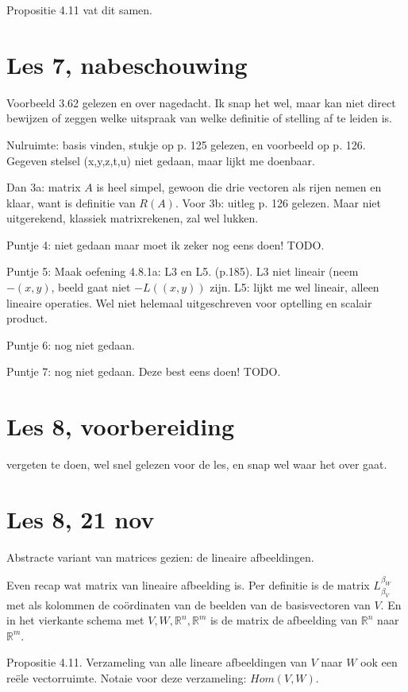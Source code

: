 \documentclass{article}
\begin{document}
Propositie 4.11 vat dit samen. 

\section*{Les 7, nabeschouwing}

Voorbeeld 3.62 gelezen en over nagedacht. Ik snap het wel, maar kan niet direct bewijzen of zeggen welke uitspraak van welke definitie of stelling af te leiden is. 

Nulruimte: basis vinden, stukje op p. 125 gelezen, en voorbeeld op p. 126. Gegeven stelsel (x,y,z,t,u) niet gedaan, maar lijkt me doenbaar. 

Dan 3a: matrix $A$ is heel simpel, gewoon die drie vectoren als rijen nemen en klaar, want is definitie van $R(A)$. Voor 3b: uitleg p. 126 gelezen. Maar niet uitgerekend, klassiek matrixrekenen, zal wel lukken. 

Puntje 4: niet gedaan maar moet ik zeker nog eens doen! TODO. 

Puntje 5: Maak oefening 4.8.1a: L3 en L5. (p.185). L3 niet lineair (neem $-(x,y)$, beeld gaat niet $-L((x,y))$ zijn. L5: lijkt me wel lineair, alleen lineaire operaties. Wel niet helemaal uitgeschreven voor optelling en scalair product. 

Puntje 6: nog niet gedaan.

Puntje 7: nog niet gedaan. Deze best eens doen! TODO. 

\section*{Les 8, voorbereiding}
vergeten te doen, wel snel gelezen voor de les, en snap wel waar het over gaat. 

\section*{Les 8, 21 nov}
Abstracte variant van matrices gezien: de lineaire afbeeldingen. 

Even recap wat matrix van lineaire afbeelding is. 
Per definitie is de matrix $L_{\beta_V}^{\beta_W}$ met als kolommen de co\"ordinaten van de beelden van de basisvectoren van $V$. En in het vierkante schema met $V, W, \mathbb{R}^n, \mathbb{R}^m$ is de matrix de afbeelding van $\mathbb{R}^n$ naar $\mathbb{R}^m$.

Propositie 4.11. Verzameling van alle lineare afbeeldingen van $V$ naar $W$ ook een re\"ele vectorruimte. Notaie voor deze verzameling: $Hom(V,W)$. 
\end{document}

